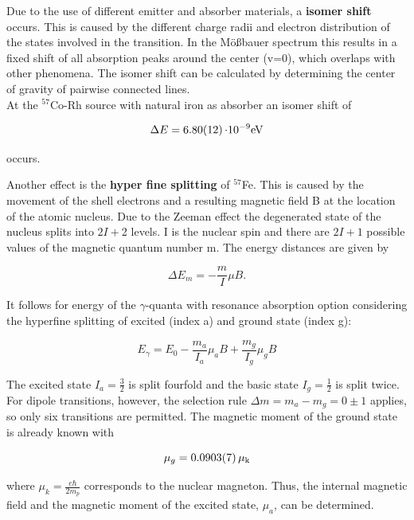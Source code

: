 

Due to the use of different emitter and absorber materials, a \textbf{isomer shift} occurs. This is caused by the different charge radii and electron distribution of the states involved in the transition.
 In the Mößbauer spectrum this results in a fixed shift of all absorption peaks around  the center (v=0), which overlaps with other phenomena. The isomer shift can be calculated by determining the center of gravity of pairwise connected lines. \\
At the $^{57}$Co-Rh source with natural iron as absorber an isomer shift of

\begin{equation}
\label{eq:isofe}
\Delta E = \SI{6.80 \pm 0.12}{\cdot 10^{-9} eV}
\end{equation}

occurs.

Another effect is the \textbf{hyper fine splitting} of $^{57}$Fe. This is caused by the movement of the shell electrons and a resulting magnetic field B at the location of the atomic nucleus.
Due to the Zeeman effect the degenerated state of the nucleus splits into $2I + $2 levels. I is the nuclear spin and there are $2I+1$ possible values of the magnetic quantum number m. The energy distances are given by

\begin{equation}
\label{eq:hyp1}
\Delta E_m = -\frac{m}{I} \mu B.
\end{equation}

It follows for energy of the $\gamma$-quanta with resonance absorption option considering the hyperfine splitting of excited (index a) and ground state (index g):

\begin{equation}
   E_{\gamma} = E_0 - \frac{m_a}{I_a}\mu_aB + \frac{m_g}{I_g}\mu_gB
\end{equation}

The excited state $I_a = \frac{3}{2}$ is split fourfold and the basic state $I_g =\frac{1}{2}$ is split twice.
For dipole transitions, however, the selection rule $\Delta m = m_a -m_g = 0\pm1$ applies, so only six transitions are permitted. The magnetic moment of the ground state is already known with

\begin{equation}
    \mu_g = \SI{0.0903\pm 0.0007}{\mu_k}
\end{equation}

where $\mu_k=\frac{e \hbar}{2m_p} $ corresponds to the nuclear magneton. Thus, the internal magnetic field and the magnetic moment of the excited state, $\mu_a$, can be determined.

